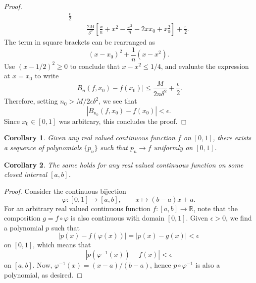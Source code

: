 \documentclass[11pt]{article}
\def\R{\mathbb{R}}
\newtheorem{corollary}{Corollary}[theorem]
\theoremstyle{definition}
\theoremstyle{remark}
\begin{document}
\begin{proof}
\begin{align*}
            \frac{\epsilon}{2} \\
            &= \frac{2M}{\delta^2}\left[\frac{x}{n} + x^2 - \frac{x^2}{n} - 2xx_0 +
            x_0^2\right] + \frac{\epsilon}{2}.
        \end{align*}
        The term in square brackets can be rearranged as \[
            (x - x_0)^2 + \frac{1}{n}(x - x^2).
        \] Use $(x - 1 / 2)^2 \geq 0$ to conclude that $x - x^2 \leq 1 / 4$, and
        evaluate the expression at $x = x_0$ to write \[
            |B_n(f, x_0) - f(x_0)| \leq \frac{M}{2n\delta^2} + \frac{\epsilon}{2}.
        \] Therefore, setting $n_0 > M / 2\epsilon\delta^2$, we see that \[
            |B_{n_0}(f, x_0) - f(x_0)| < \epsilon.
        \] Since $x_0 \in [0, 1]$ was arbitrary, this concludes the proof.
    \end{proof}

    \begin{corollary}
        Given any real valued continuous function $f$ on $[0, 1]$, there exists a
        sequence of polynomials $\{p_n\}$ such that $p_n \to f$ uniformly on $[0,
        1]$.
    \end{corollary}
    \begin{corollary}
        The same holds for any real valued continuous function on some closed interval
        $[a, b]$.
    \end{corollary}
    \begin{proof}
        Consider the continuous bijection \[
            \varphi\colon [0, 1] \to [a, b], \qquad x \mapsto (b - a)x + a.
        \] For an arbitrary real valued continuous function $f\colon [a, b] \to \R$,
        note that the composition $g = f\circ \varphi$ is also continuous with domain
        $[0, 1]$. Given $\epsilon > 0$, we find a polynomial $p$ such that \[
            |p(x) - f(\varphi(x))| = |p(x) - g(x)| < \epsilon
        \] on $[0, 1]$, which means that \[
            |p(\varphi^{-1}(x)) - f(x)| < \epsilon
        \] on $[a, b]$. Now, $\varphi^{-1}(x) = (x - a) / (b - a)$, hence $p \circ
        \varphi^{-1}$ is also a polynomial, as desired.
    \end{proof}
\end{document}
